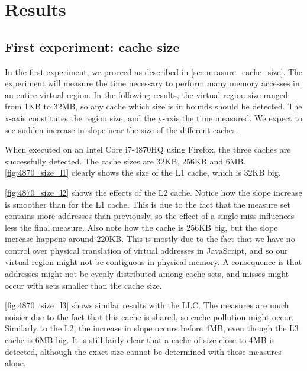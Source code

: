 \documentclass[a4paper,11pt,oneside]{report}
\begin{document}
\section{Results}

\subsection{First experiment: cache size}

In the first experiment, we proceed as described in \autoref{sec:measure_cache_size}. The experiment will measure the time necessary to perform many memory accesses in an entire virtual region. In the following results, the virtual region size ranged from 1KB to 32MB, so any cache which size is in bounds should be detected. The x-axis constitutes the region size, and the y-axis the time measured. We expect to see sudden increase in slope near the size of the different caches.

When executed on an Intel Core i7-4870HQ using Firefox, the three caches are successfully detected. The cache sizes are 32KB, 256KB and 6MB. \autoref{fig:4870_size_l1} clearly shows the size of the L1 cache, which is 32KB big. 

\autoref{fig:4870_size_l2} shows the effects of the L2 cache. Notice how the slope increase is smoother than for the L1 cache. This is due to the fact that the measure set contains more addresses than previously, so the effect of a single miss influences less the final measure. Also note how the cache is 256KB big, but the slope increase happens around 220KB. This is mostly due to the fact that we have no control over physical translation of virtual addresses in JavaScript, and so our virtual region might not be contiguous in physical memory. A consequence is that addresses might not be evenly distributed among cache sets, and misses might occur with sets smaller than the cache size.

\autoref{fig:4870_size_l3} shows similar results with the LLC. The measures are much noisier due to the fact that this cache is shared, so cache pollution might occur. Similarly to the L2, the increase in slope occurs before 4MB, even though the L3 cache is 6MB big. It is still fairly clear that a cache of size close to 4MB is detected, although the exact size cannot be determined with those measures alone.
\end{document}
